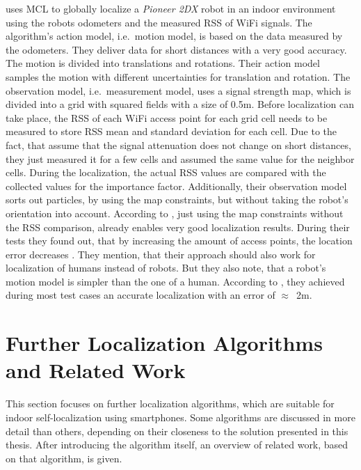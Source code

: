 \citet{siddiqi:experiments_mcl_wifi} uses \ac{MCL} to globally localize a \emph{Pioneer 2DX} robot in an indoor environment using the robots odometers and the measured \ac{RSS} of WiFi signals. The algorithm's action model, i.e.\ motion model, is based on the data measured by the odometers. They deliver data for short distances with a very good accuracy. The motion is divided into translations and rotations. Their action model samples the motion with different uncertainties for translation and rotation. The observation model, i.e.\ measurement model, uses a signal strength map, which is divided into a grid with squared fields with a size of 0.5m. Before localization can take place, the \ac{RSS} of each WiFi access point for each grid cell needs to be measured to store \ac{RSS} mean and standard deviation for each cell. Due to the fact, that \citet{siddiqi:experiments_mcl_wifi} assume that the signal attenuation does not change on short distances, they just measured it for a few cells and assumed the same value for the neighbor cells. During the localization, the actual \ac{RSS} values are compared with the collected values for the importance factor. Additionally, their observation model sorts out particles, by using the map constraints, but without taking the robot's orientation into account. According to \citet{siddiqi:experiments_mcl_wifi}, just using the map constraints without the \ac{RSS} comparison, already enables very good localization results.
During their tests they found out, that by increasing the amount of access points, the location error decreases \citep{siddiqi:experiments_mcl_wifi}. They mention, that their approach should also work for localization of humans instead of robots. But they also note, that a robot's motion model is simpler than the one of a human. According to \citet{siddiqi:experiments_mcl_wifi}, they achieved during most test cases an accurate localization with an error of $\approx$~2m.


\section{Further Localization Algorithms and Related Work}
This section focuses on further localization algorithms, which are suitable for indoor self-localization using smartphones. Some algorithms are discussed in more detail than others, depending on their closeness to the solution presented in this thesis. After introducing the algorithm itself, an overview of related work, based on that algorithm, is given.

